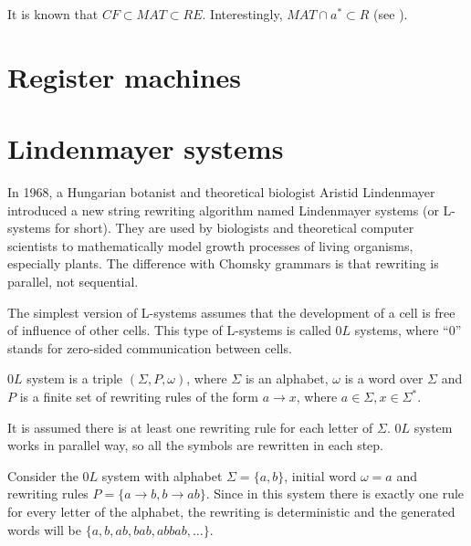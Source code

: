 It is known that $CF \subset MAT \subset RE$. Interestingly, $MAT \cap {a}^* \subset R$ (see \cite{Besozzi:PhD:2004}).


\section{Register machines} %
\label{sec:register_machines}





\section{Lindenmayer systems} %
\label{sec:lindenmayer_systems}

In 1968, a Hungarian botanist and theoretical biologist Aristid Lindenmayer introduced \cite{Lindenmayer68} a new string rewriting algorithm named Lindenmayer systems (or L-systems for short). They are used by biologists and theoretical computer scientists to mathematically model growth processes of living organisms, especially plants. The difference with Chomsky grammars is that rewriting is parallel, not sequential.

The simplest version of L-systems assumes that the development of a cell is free of influence of other cells.
This type of L-systems is called $0L$ systems, where ``0'' stands for zero-sided communication between cells.

\begin{definition}
$0L$ system is a triple $(\Sigma, P, \omega)$, where $\Sigma$ is an alphabet, $\omega$ is a word over $\Sigma$ and $P$ is a finite set of rewriting rules of the form $a\rightarrow x$, where $a\in\Sigma, x\in\Sigma^*$.
\end{definition}

It is assumed there is at least one rewriting rule for each letter of $\Sigma$. $0L$ system works in parallel way, so all the symbols are rewritten in each step.

\begin{example}
Consider the $0L$ system with alphabet $\Sigma = \{a,b\}$, initial word $\omega = a$ and rewriting rules $P = \{a\rightarrow b, b\rightarrow ab\}$.
Since in this system there is exactly one rule for every letter of the alphabet, the rewriting is deterministic and the generated words will be $\{a, b, ab, bab, abbab, \dots \}$. 
\end{example}

